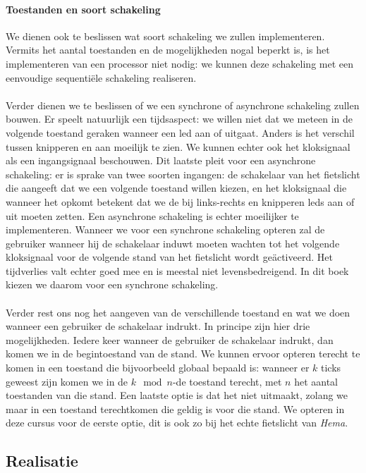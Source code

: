 \paragraph{Toestanden en soort schakeling}
We dienen ook te beslissen wat soort schakeling we zullen implementeren. Vermits het aantal toestanden en de mogelijkheden nogal beperkt is, is het implementeren van een processor niet nodig: we kunnen deze schakeling met een eenvoudige sequenti\"ele schakeling realiseren.
\paragraph{}
Verder dienen we te beslissen of we een synchrone of asynchrone schakeling zullen bouwen. Er speelt natuurlijk een tijdsaspect: we willen niet dat we meteen in de volgende toestand geraken wanneer een led aan of uitgaat. Anders is het verschil tussen knipperen en aan moeilijk te zien. We kunnen echter ook het kloksignaal als een ingangsignaal beschouwen. Dit laatste pleit voor een asynchrone schakeling: er is sprake van twee soorten ingangen: de schakelaar van het fietslicht die aangeeft dat we een volgende toestand willen kiezen, en het kloksignaal die wanneer het opkomt betekent dat we de bij links-rechts en knipperen leds aan of uit moeten zetten. Een asynchrone schakeling is echter moeilijker te implementeren. Wanneer we voor een synchrone schakeling opteren zal de gebruiker wanneer hij de schakelaar induwt moeten wachten tot het volgende kloksignaal voor de volgende stand van het fietslicht wordt ge\"activeerd. Het tijdverlies valt echter goed mee en is meestal niet levensbedreigend. In dit boek kiezen we daarom voor een synchrone schakeling.
\paragraph{}
Verder rest ons nog het aangeven van de verschillende toestand en wat we doen wanneer een gebruiker de schakelaar indrukt. In principe zijn hier drie mogelijkheden. Iedere keer wanneer de gebruiker de schakelaar indrukt, dan komen we in de begintoestand van de stand. We kunnen ervoor opteren terecht te komen in een toestand die bijvoorbeeld globaal bepaald is: wanneer er $k$ ticks geweest zijn komen we in de $k\mod n$-de toestand terecht, met $n$ het aantal toestanden van die stand. Een laatste optie is dat het niet uitmaakt, zolang we maar in een toestand terechtkomen die geldig is voor die stand. We opteren in deze cursus voor de eerste optie, dit is ook zo bij het echte fietslicht van \emph{Hema}.
\subsection{Realisatie}
